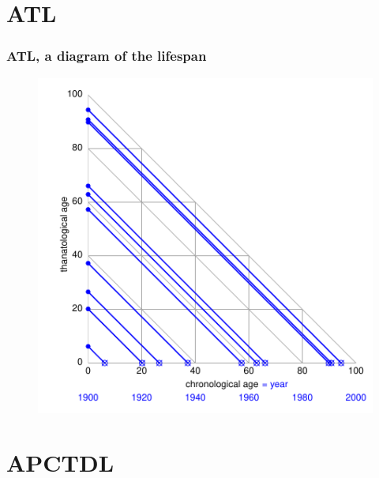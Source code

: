 \documentclass[20pt]{beamer}
\begin{document}
\section{ATL}
\begin{frame}
\frametitle{ATL, a diagram of the lifespan}
\begin{figure}[b]
    \centering
    \includegraphics{Figures/LabPres/ATL5.pdf}
\end{figure} 
\end{frame}
\section{APCTDL}
\end{document}
